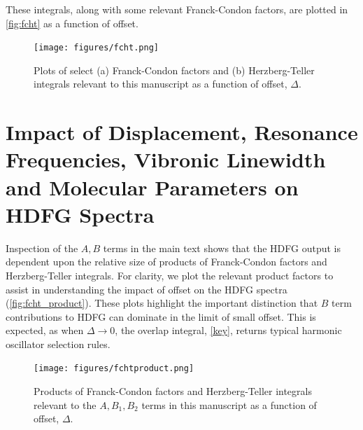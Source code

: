 \documentclass[aip, jcp, reprint, onecolumn, nofootinbib]{revtex4-2}
\begin{document}
These integrals, along with some relevant Franck-Condon factors, are plotted in \autoref{fig:fcht} as a function of offset. 

\begin{figure}[!htbp]
	\centering
	\texttt{[image: figures/fcht.png]}
	\caption{Plots of select (a) Franck-Condon factors and (b) Herzberg-Teller integrals relevant to this manuscript as a function of offset, $\Delta$.} 
	\label{fig:fcht}
\end{figure}


\newpage
\section{Impact of Displacement, Resonance Frequencies, Vibronic Linewidth and Molecular Parameters on HDFG Spectra}
Inspection of the $A,B$ terms in the main text shows that the HDFG output is dependent upon the relative size of products of Franck-Condon factors and Herzberg-Teller integrals.
For clarity, we plot the relevant product factors to assist in understanding the impact of offset on the HDFG spectra (\autoref{fig:fcht_product}).
These plots highlight the important distinction that $B$ term contributions to HDFG can dominate in the limit of small offset.
This is expected, as when $\Delta \rightarrow 0$, the overlap integral, \autoref{key}, returns typical harmonic oscillator selection rules.

\begin{figure}[!htbp]
	\centering
	\texttt{[image: figures/fchtproduct.png]}
	\caption{Products of Franck-Condon factors and Herzberg-Teller integrals relevant to the $A, B_1, B_2$ terms in this manuscript as a function of offset, $\Delta$.} 
	\label{fig:fcht_product}
\end{figure}
\end{document}
